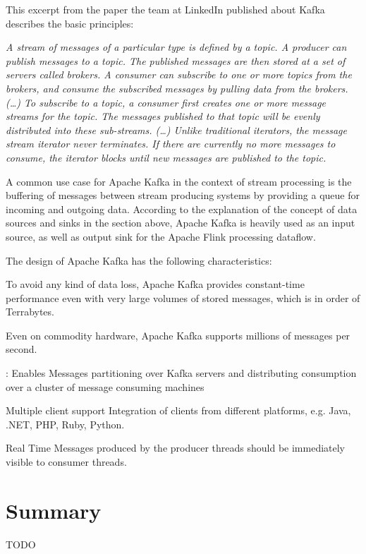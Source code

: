 This excerpt from the paper \cite{Neha11} the team at LinkedIn published about Kafka describes the
basic principles:

\textit{A stream of messages of a particular type is defined by a topic. A producer can publish
messages to a topic. The published messages are then stored at a set of servers called brokers.
A consumer can subscribe to one or more topics from the brokers, and consume the subscribed
messages by pulling data from the brokers. (…) To subscribe to a topic, a consumer first creates
one or more message streams for the topic. The messages published to that topic will be evenly
distributed into these sub-streams. (…)  Unlike traditional iterators, the message stream iterator
never terminates. If there are currently no more messages to consume, the iterator blocks until
new messages are published to the topic.}

A common use case for Apache Kafka in the context of stream processing is the buffering of messages
between stream producing systems by providing a queue for incoming and outgoing data. According
to the explanation of the concept of data sources and sinks in the section above, Apache Kafka
is heavily used as an input source, as well as output sink for the Apache Flink processing dataflow.

The design of Apache Kafka has the following characteristics:

\begin{description}
    \item [Persistent messages]
    To avoid any kind of data loss, Apache Kafka provides constant-time performance even with very
    large volumes of stored messages, which is in order of Terrabytes.

    \item [High throughput]
    Even on commodity hardware, Apache Kafka supports millions of messages per second.

    \item [Distributed by design]:
    Enables Messages partitioning over Kafka servers and distributing consumption over a cluster of
    message consuming machines

    \item{Multiple client support}
    Integration of clients from different platforms, e.g. Java, .NET, PHP, Ruby, Python.

    \item{Real Time}
    Messages produced by the producer threads should be immediately visible to consumer threads.
\end{description}

\section{Summary}

TODO